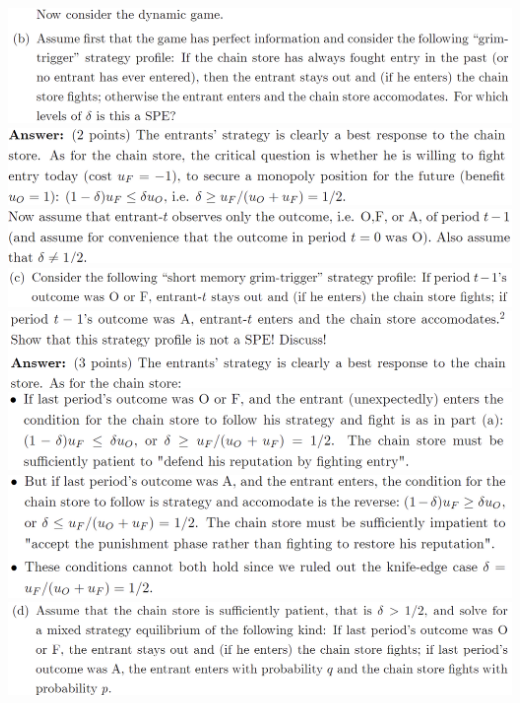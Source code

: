 \documentclass[8pt,landscape]{extarticle}
\begin{document}
\begin{multicols*}{3}
    \includegraphics[width=0.95\linewidth,keepaspectratio]{Screenshots/Screenshot 2024-03-15 093907.png}
    \includegraphics[width=0.9\linewidth,keepaspectratio]{Screenshots/Screenshot 2024-03-15 093914.png}
    \includegraphics[width=0.89\linewidth,keepaspectratio]{Screenshots/Screenshot 2024-03-15 093919.png}
    \includegraphics[width=0.94\linewidth,keepaspectratio]{Screenshots/Screenshot 2024-03-15 093923.png}
    \includegraphics[width=0.9\linewidth,keepaspectratio]{Screenshots/Screenshot 2024-03-15 093929.png}
    \includegraphics[width=0.89\linewidth,keepaspectratio]{Screenshots/Screenshot 2024-03-15 093937.png}
    \includegraphics[width=0.88\linewidth,keepaspectratio]{Screenshots/Screenshot 2024-03-15 093946.png}
    \includegraphics[width=0.95\linewidth,keepaspectratio]{Screenshots/Screenshot 2024-03-15 093951.png}

\end{multicols*}
\end{document}
